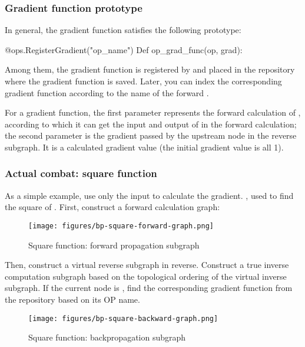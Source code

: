 \begin{content}
\subsubsection{Gradient function prototype}
In general, the gradient function satisfies the following prototype:

\begin{leftbar}
\begin{python}
@ops.RegisterGradient("op_name")
Def op_grad_func(op, grad):
\end{python}
\end{leftbar}

Among them, the gradient function is registered by  and placed in the repository where the gradient function is saved. Later, you can index the corresponding gradient function according to the name of the forward .

For a gradient function, the first parameter  represents the forward calculation of , according to which it can get the input and output of  in the forward calculation; the second parameter  is the gradient passed by the upstream node in the reverse subgraph. It is a calculated gradient value (the initial gradient value is all 1).


\subsubsection{Actual combat: square function}
As a simple example, use only the input to calculate the gradient. , used to find the square of . First, construct a forward calculation graph:

\begin{figure}[!h]
  \centering
  \texttt{[image: figures/bp-square-forward-graph.png]}
  \caption{Square function: forward propagation subgraph}
  \label{fig:bp-square-forward-graph}
\end{figure}

Then, construct a virtual reverse subgraph in reverse. Construct a true inverse computation subgraph based on the topological ordering of the virtual inverse subgraph. If the current node is , find the corresponding gradient function  from the repository based on its OP name.

\begin{figure}[!htbp]
  \centering
  \texttt{[image: figures/bp-square-backward-graph.png]}
  \caption{Square function: backpropagation subgraph}
  \label{fig:bp-square-backward-graph}
\end{figure}


\end{content}
